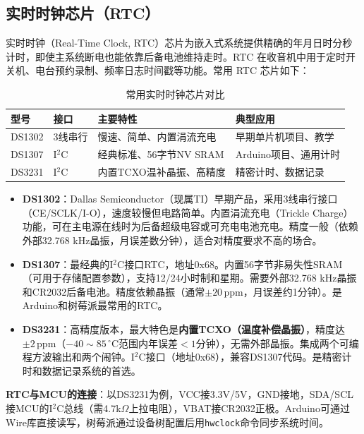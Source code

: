 \documentclass[12pt,UTF8]{ctexbook}
\begin{document}
\subsection{实时时钟芯片（RTC）}
\label{subsec:rtc_chips}

实时时钟（Real-Time Clock, RTC）芯片为嵌入式系统提供精确的年月日时分秒计时，即使主系统断电也能依靠后备电池维持走时。RTC 在收音机中用于定时开关机、电台预约录制、频率日志时间戳等功能。常用 RTC 芯片如下：

\begin{table}[htbp]
\centering
\caption{常用实时时钟芯片对比}
\label{tab:rtc_chips}
\begin{tabular}{@{}llp{4cm}p{4cm}@{}}
    \toprule
    \textbf{型号} & \textbf{接口} & \textbf{主要特性} & \textbf{典型应用} \\
    \midrule
    DS1302 & 3线串行 & 慢速、简单、内置涓流充电 & 早期单片机项目、教学 \\
    DS1307 & I$^2$C & 经典标准、56字节NV SRAM & Arduino项目、通用计时 \\
    DS3231 & I$^2$C & 内置TCXO温补晶振、高精度 & 精密计时、数据记录 \\
    \bottomrule
\end{tabular}
\end{table}

\begin{itemize}[leftmargin=2cm]
    \item \textbf{DS1302}：Dallas Semiconductor（现属TI）早期产品，采用3线串行接口（CE/SCLK/I-O），速度较慢但电路简单。内置涓流充电（Trickle Charge）功能，可在主电源在线时为后备超级电容或可充电电池充电。精度一般（依赖外部32.768 kHz晶振，月误差数分钟），适合对精度要求不高的场合。
    \item \textbf{DS1307}：最经典的I$^2$C接口RTC，地址0x68。内置56字节非易失性SRAM（可用于存储配置参数），支持12/24小时制和星期。需要外部32.768 kHz晶振和CR2032后备电池。精度依赖晶振（通常$\pm 20\,\mathrm{ppm}$，月误差约1分钟）。是Arduino和树莓派最常用的RTC。
    \item \textbf{DS3231}：高精度版本，最大特色是\textbf{内置TCXO（温度补偿晶振）}，精度达$\pm 2\,\mathrm{ppm}$（$-40\sim85\,^\circ\mathrm{C}$范围内年误差$<1$分钟），无需外部晶振。集成两个可编程方波输出和两个闹钟。I$^2$C接口（地址0x68），兼容DS1307代码。是精密计时和数据记录系统的首选。
\end{itemize}

\textbf{RTC与MCU的连接}：以DS3231为例，VCC接3.3V/5V，GND接地，SDA/SCL接MCU的I$^2$C总线（需4.7k$\Omega$上拉电阻），VBAT接CR2032正极。Arduino可通过Wire库直接读写，树莓派通过设备树配置后用\texttt{hwclock}命令同步系统时间。
\end{document}
